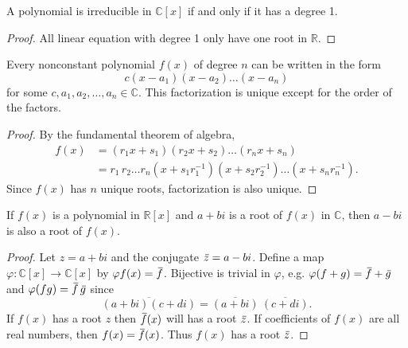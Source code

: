 \begin{corollary}
    A polynomial is irreducible in $\mathbb{C}[x]$ if and only if it has a degree 1.
\end{corollary}
\begin{proof}
    All linear equation with degree 1 only have one root in $\mathbb{R}$.
\end{proof}

\begin{corollary}
    Every nonconstant polynomial $f(x)$ of degree $n$ can be written in the form 
    \[
        c(x-a_1)(x-a_2) \ldots (x-a_n)
    \]
    for some $c, a_1, a_2, \ldots, a_n \in \mathbb{C}$. This factorization is unique except for the order 
    of the factors.
\end{corollary}
\begin{proof}
    By the fundamental theorem of algebra, 
    \begin{align*}
        f(x) &= (r_1x + s_1)(r_2x + s_2) \ldots (r_nx + s_n)\\
        &= r_1\, r_2 \ldots r_n (x + s_1r_1^{-1})(x + s_2r^{-1}_2) \ldots (x + s_nr^{-1}_n).
    \end{align*}
    Since $f(x)$ has $n$ unique roots, factorization is also unique.
\end{proof}

\begin{lemma}
    If $f(x)$ is a polynomial in $\mathbb{R}[x]$ and $a + bi$ is a root of $f(x)$ in $\mathbb{C}$, 
    then $a - bi$ is also a root of $f(x)$.
\end{lemma}
\begin{proof}
    Let $z = a+bi$ and the conjugate $\,\overline{\!{z}} = a - bi$. Define a map 
    $\varphi: \mathbb{C}[x] \to \mathbb{C}[x]$ by $\varphi f(x) = \,\overline{\!{f}}$. 
    Bijective is trivial in $\varphi$, e.g.
        $\varphi(f + g) = \,\overline{\!{f}} + \,\overline{\!{g}}$
    and $\varphi(fg)= \,\overline{\!{f}} \, \,\overline{\!{g}}$ since 
    \[
        \overline{(a+bi)(c+di)} = \overline{(a+bi)}\> \overline{(c+di)}.
    \]
    If $f(x)$ has a root $z$ then $\,\overline{\!{f}}(x)$ will has a root $\,\overline{\!{z}}$. 
    If coefficients of $f(x)$ are all real numbers, then $f(x) = \,\overline{\!{f}}(x)$. 
    Thus $f(x)$ has a root $\,\overline{\!{z}}$.
\end{proof}

